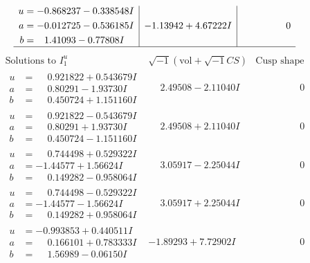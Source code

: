 \documentclass[1p]{elsarticle_modified}
\theoremstyle{definition}
\newcommand{\I}{\sqrt{-1}}
\begin{document}
$$\begin{array}{c|c|c}
\begin{aligned}
u &= -0.868237 - 0.338548 I \\
a &= -0.012725 - 0.536185 I \\
b &= \phantom{-}1.41093 - 0.77808 I\end{aligned}
 & -1.13942 + 4.67222 I & \phantom{-0.000000 } 0\\
 \hline 
 \end{array}$$\newpage$$\begin{array}{c|c|c}  
\text{Solutions to }I^u_{1}& \I (\text{vol} + \sqrt{-1}CS) & \text{Cusp shape}\\
 \hline 
\begin{aligned}
u &= \phantom{-}0.921822 + 0.543679 I \\
a &= \phantom{-}0.80291 - 1.93730 I \\
b &= \phantom{-}0.450724 + 1.151160 I\end{aligned}
 & \phantom{-}2.49508 - 2.11040 I & \phantom{-0.000000 } 0 \\ \hline\begin{aligned}
u &= \phantom{-}0.921822 - 0.543679 I \\
a &= \phantom{-}0.80291 + 1.93730 I \\
b &= \phantom{-}0.450724 - 1.151160 I\end{aligned}
 & \phantom{-}2.49508 + 2.11040 I & \phantom{-0.000000 } 0 \\ \hline\begin{aligned}
u &= \phantom{-}0.744498 + 0.529322 I \\
a &= -1.44577 + 1.56624 I \\
b &= \phantom{-}0.149282 - 0.958064 I\end{aligned}
 & \phantom{-}3.05917 - 2.25044 I & \phantom{-0.000000 } 0 \\ \hline\begin{aligned}
u &= \phantom{-}0.744498 - 0.529322 I \\
a &= -1.44577 - 1.56624 I \\
b &= \phantom{-}0.149282 + 0.958064 I\end{aligned}
 & \phantom{-}3.05917 + 2.25044 I & \phantom{-0.000000 } 0 \\ \hline\begin{aligned}
u &= -0.993853 + 0.440511 I \\
a &= \phantom{-}0.166101 + 0.783333 I \\
b &= \phantom{-}1.56989 - 0.06150 I\end{aligned}
 & -1.89293 + 7.72902 I & \phantom{-0.000000 } 0 \\ \hline\begin{aligned}

\end{aligned}
\end{array}$$
\end{document}
